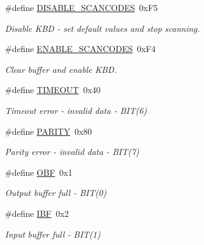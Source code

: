 \begin{DoxyCompactItemize}
\#define \hyperlink{group__i8042_ga5add224b75509ea02834f2fe73c5636f}{D\+I\+S\+A\+B\+L\+E\+\_\+\+S\+C\+A\+N\+C\+O\+D\+ES}~0x\+F5
\begin{DoxyCompactList}\small\item\em Disable K\+BD -\/ set default values and stop scanning. \end{DoxyCompactList}\item 
\hypertarget{group__i8042_ga4a0257a2054c5a33cc50947746332ced}{}\label{group__i8042_ga4a0257a2054c5a33cc50947746332ced} 
\#define \hyperlink{group__i8042_ga4a0257a2054c5a33cc50947746332ced}{E\+N\+A\+B\+L\+E\+\_\+\+S\+C\+A\+N\+C\+O\+D\+ES}~0x\+F4
\begin{DoxyCompactList}\small\item\em Clear buffer and enable K\+BD. \end{DoxyCompactList}\item 
\hypertarget{group__i8042_ga45ba202b05caf39795aeca91b0ae547e}{}\label{group__i8042_ga45ba202b05caf39795aeca91b0ae547e} 
\#define \hyperlink{group__i8042_ga45ba202b05caf39795aeca91b0ae547e}{T\+I\+M\+E\+O\+UT}~0x40
\begin{DoxyCompactList}\small\item\em Timeout error -\/ invalid data -\/ B\+I\+T(6) \end{DoxyCompactList}\item 
\hypertarget{group__i8042_gaf6996d12e71a534569c41a25de7d6d52}{}\label{group__i8042_gaf6996d12e71a534569c41a25de7d6d52} 
\#define \hyperlink{group__i8042_gaf6996d12e71a534569c41a25de7d6d52}{P\+A\+R\+I\+TY}~0x80
\begin{DoxyCompactList}\small\item\em Parity error -\/ invalid data -\/ B\+I\+T(7) \end{DoxyCompactList}\item 
\hypertarget{group__i8042_ga45967c9e25447ba853cf6fb4ac545fe6}{}\label{group__i8042_ga45967c9e25447ba853cf6fb4ac545fe6} 
\#define \hyperlink{group__i8042_ga45967c9e25447ba853cf6fb4ac545fe6}{O\+BF}~0x1
\begin{DoxyCompactList}\small\item\em Output buffer full -\/ B\+I\+T(0) \end{DoxyCompactList}\item 
\hypertarget{group__i8042_ga3c48b10907056351582baf9f6478598e}{}\label{group__i8042_ga3c48b10907056351582baf9f6478598e} 
\#define \hyperlink{group__i8042_ga3c48b10907056351582baf9f6478598e}{I\+BF}~0x2
\begin{DoxyCompactList}\small\item\em Input buffer full -\/ B\+I\+T(1) \end{DoxyCompactList}\item 

\end{DoxyCompactItemize}
